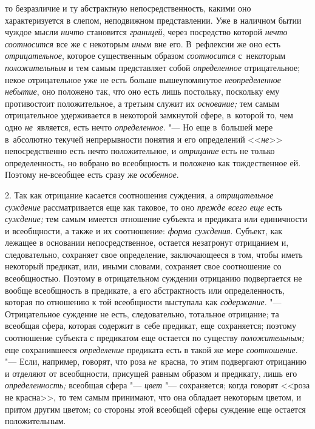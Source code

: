 то безразличие и ту абстрактную непосредственность, какими оно характеризуется
в слепом, неподвижном представлении. Уже в наличном бытии чуждое мысли
{\em ничто} становится {\em границей}, через посредство которой
{\em нечто соотносится} все же с некоторым {\em иным} вне его. В~рефлексии же
оно есть {\em отрицательное}, которое существенным образом {\em соотносится}
с~некоторым {\em положительным} и тем самым представляет собой
{\em определенное} отрицательное; некое отрицательное уже не есть больше
вышеупомянутое {\em неопределенное небытие}, оно положено так, что оно есть
лишь постольку, поскольку ему противостоит положительное, а третьим служит их
{\em основание;} тем самым отрицательное удерживается в некоторой замкнутой
сфере, в~которой то, чем одно {\em не}~является, есть нечто {\em определенное}.
"--- Но еще в~большей мере в~абсолютно текучей непрерывности понятия и его
определений <<{\em не}>> непосредственно есть нечто
положительное, и {\em отрицание} есть не только определенность,
но вобрано во всеобщность и положено как тождественное ей. Поэтому
не-всеобщее есть сразу же {\em особенное}.

2. Так как отрицание касается соотношения суждения, а
{\em отрицательное суждение} рассматривается еще как таковое, то оно
{\em прежде всего еще} есть {\em суждение;}
тем самым имеется отношение субъекта и предиката или
единичности и всеобщности, а также и их соотношение: {\em форма суждения}.
Субъект, как лежащее в основании непосредственное, остается
незатронут отрицанием и, следовательно, сохраняет свое определение,
заключающееся в том, чтобы иметь некоторый предикат, или, иными словами,
сохраняет свое соотношение со всеобщностью. Поэтому в отрицательном
суждении отрицанию подвергается не вообще всеобщность в предикате, а его
абстрактность или определенность, которая по отношению к той всеобщности
выступала как {\em содержание}. "---
Отрицательное суждение не есть, следовательно, тотальное
отрицание; та всеобщая сфера, которая содержит в~себе предикат, еще
сохраняется; поэтому соотношение субъекта с предикатом еще остается по
существу {\em положительным;} еще сохранившееся {\em определение}
предиката есть в такой же мере {\em соотношение}. "--- Если, например,
говорят, что роза {\em не}~красна, то этим подвергают отрицанию и отделяют
от всеобщности, присущей равным образом и предикату, лишь его
{\em определенность;} всеобщая сфера "--- {\em цвет}
"--- сохраняется; когда говорят <<роза не красна>>, то тем самым
принимают, что она обладает некоторым цветом, и притом другим цветом; со
стороны этой всеобщей сферы суждение еще остается положительным.

